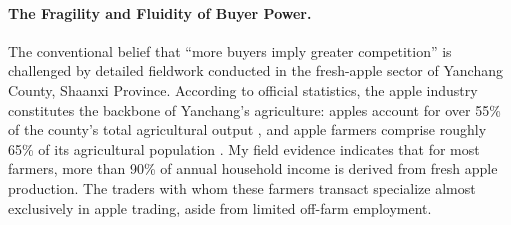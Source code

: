 \paragraph{The Fragility and Fluidity of Buyer Power.}
The conventional belief that ``more buyers imply greater competition'' is challenged by detailed fieldwork conducted in the fresh-apple sector of Yanchang County, Shaanxi Province. According to official statistics, the apple industry constitutes the backbone of Yanchang's agriculture: apples account for over 55\% of the county's total agricultural output \citep{cfa_2025_yanchang_apple_futures}, and apple farmers comprise roughly 65\% of its agricultural population \citep{agri_2023_yanchang_apple}. My field evidence indicates that for most farmers, more than 90\% of annual household income is derived from fresh apple production. The traders with whom these farmers transact specialize almost exclusively in apple trading, aside from limited off-farm employment.



